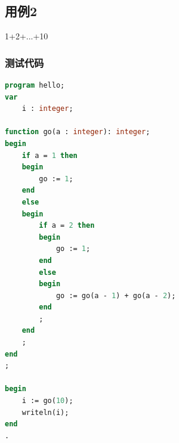 \documentclass{article}
\begin{document}
\subsection{用例2}
\par 1+2+...+10
\subsubsection{测试代码}
\begin{lstlisting}[language=pascal,showstringspaces=false]
program hello;
var
	i : integer;

function go(a : integer): integer;
begin
	if a = 1 then
	begin
		go := 1;
	end
	else
	begin
		if a = 2 then
		begin
			go := 1;
		end
		else
		begin
			go := go(a - 1) + go(a - 2);
		end
		;
	end
	;
end
;

begin
	i := go(10);
	writeln(i);
end
.
\end{lstlisting}
\end{document}
